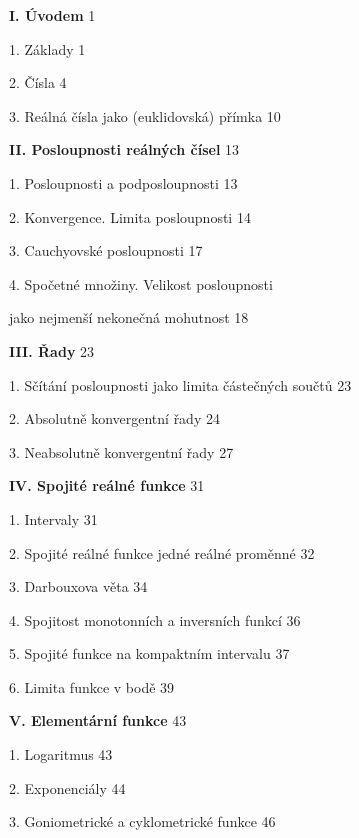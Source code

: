 \documentclass[12pt]{article}
\begin{document}
 \vskip10mm
 
 
 {\bf I. Úvodem} \hskip10mm 1
  
 \hskip5mm 1. Základy \hskip10mm 1
 
 \hskip5mm 2. Čísla \hskip10mm 4
 
 \hskip5mm 3. Reálná čísla jako (euklidovská) přímka \hskip10mm 10
 
 \bigskip
 
 {\bf II. Posloupnosti reálných čísel} \hskip10mm 13
 
 \hskip5mm 1. Posloupnosti a podposloupnosti \hskip10mm 13
 
 \hskip5mm 2. Konvergence. Limita posloupnosti  \hskip10mm 14
 
 \hskip5mm 3. Cauchyovské posloupnosti  \hskip10mm 17
 
 \hskip5mm 4. Spočetné množiny. Velikost posloupnosti
 
 \hskip10mm jako nejmenší nekonečná mohutnost  \hskip10mm 18
 
 \bigskip
 
 {\bf III. Řady} \hskip 10mm 23
 
 \hskip5mm 1. Sčítání posloupnosti jako limita částečných součtů  \hskip10mm 23
 
 \hskip5mm 2. Absolutně konvergentní řady \hskip10mm 24
 
 \hskip5mm 3. Neabsolutně konvergentní řady  \hskip10mm 27
 
 \bigskip
 
 {\bf IV. Spojité reálné funkce}  \hskip10mm 31
 
 \hskip5mm 1. Intervaly \hskip10mm 31
 
 \hskip5mm 2. Spojité reálné funkce jedné reálné proměnné  \hskip10mm 32
 
 \hskip5mm 3. Darbouxova věta \hskip10mm 34
 
 \hskip5mm 4. Spojitost monotonních a inversních funkcí \hskip10mm 36
 
 \hskip5mm 5. Spojité funkce na kompaktním intervalu \hskip10mm 37
 
 \hskip5mm 6. Limita funkce v bodě   \hskip10mm 39
 
 \bigskip
 
 {\bf V. Elementární funkce} \hskip10mm 43
 
 \hskip5mm 1. Logaritmus\hskip10mm 43
 
  \hskip5mm 2. Exponenciály  \hskip10mm 44
  
 \hskip5mm 3. Goniometrické a cyklometrické funkce \hskip10mm 46
 
\end{document}

